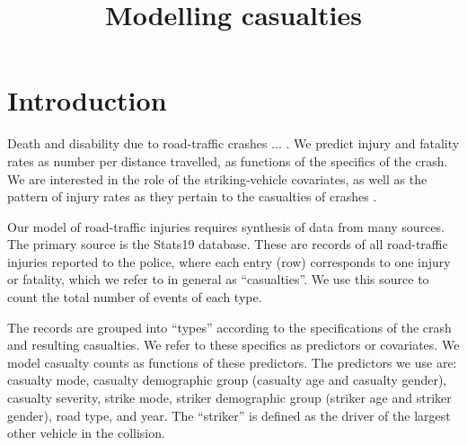 \documentclass{article}
\title{Modelling casualties}
\begin{document}
\maketitle


\section{Introduction}

Death and disability due to road-traffic crashes ... . We predict injury and fatality rates as number per distance travelled, as functions of the specifics of the crash. We are interested in the role of the striking-vehicle covariates, as well as the pattern of injury rates as they pertain to the casualties of crashes \citep{Feleke2017,Scholes2017a}.

Our model of road-traffic injuries requires synthesis of data from many sources. The primary source is the Stats19 database. These are records of all road-traffic injuries reported to the police, where each entry (row) corresponds to one injury or fatality, which we refer to in general as ``casualties''. We use this source to count the total number of events of each type.

The records are grouped into ``types'' according to the specifications of the crash and resulting casualties. We refer to these specifics as predictors or covariates. We model casualty counts as functions of these predictors. The predictors we use are: casualty mode, casualty demographic group (casualty age and casualty gender), casualty severity, strike mode, striker demographic group (striker age and striker gender), road type, and year. The ``striker'' is defined as the driver of the largest other vehicle in the collision.
\end{document}
